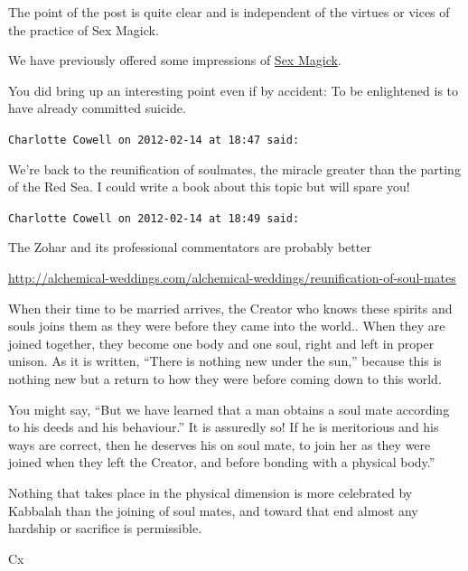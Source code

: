 \begin{footnotesize}
\begin{sffamily}
The point of the post is quite clear and is independent of the virtues or vices of the practice of Sex Magick.

We have previously offered some impressions of
\href{http://www.gornahoor.net/?p=51}{Sex Magick}.


You did bring up an interesting point even if by accident: To be enlightened is to have already committed suicide.

\hfill

\texttt{Charlotte Cowell on 2012-02-14 at 18:47 said:}

We're back to the reunification of soulmates, the miracle greater than the parting of the Red Sea. I could write a book about this topic but will spare you!

\hfill

\texttt{Charlotte Cowell on 2012-02-14 at 18:49 said:}

The Zohar and its professional commentators are probably better

\url{http://alchemical-weddings.com/alchemical-weddings/reunification-of-soul-mates}


When their time to be married arrives, the Creator who knows these spirits and souls joins them as they were before they came into the world.. When they are joined together, they become one body and one soul, right and left in proper unison. As it is written, ``There is nothing new under the sun,'' because this is nothing new but a return to how they were before coming down to this world.

You might say, ``But we have learned that a man obtains a soul mate according to his deeds and his behaviour.'' It is assuredly so! If he is meritorious and his ways are correct, then he deserves his on soul mate, to join her as they were joined when they left the Creator, and before bonding with a physical body.''

Nothing that takes place in the physical dimension is more celebrated by Kabbalah than the joining of soul mates, and toward that end almost any hardship or sacrifice is permissible.

Cx

\end{sffamily}
\end{footnotesize}


